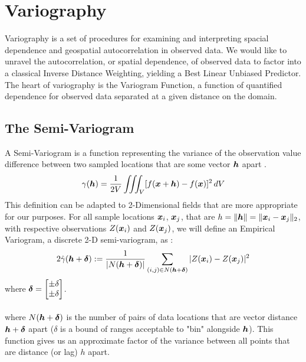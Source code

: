 \documentclass[11pt]{ucthesis}
\newcommand{\vect}[1]{{\it{\boldsymbol{#1}}}}
\begin{document}
\newpage

\section{Variography}
Variography is a set of procedures for examining and interpreting spacial dependence and geospatial autocorrelation in observed data. We would like to unravel the autocorrelation, or spatial dependence, of observed data to factor into a classical Inverse Distance Weighting, yielding a Best Linear Unbiased Predictor. The heart of variography is the Variogram Function, a function of quantified dependence for observed data separated at a given distance on the domain.

\subsection{The Semi-Variogram}
A Semi-Variogram is a function representing the variance of the observation value difference between two sampled locations that are some vector $\vect{h}$ apart \cite{matheron:geostat}.
\begin{equation}
	\gamma(\vect{h})=\frac{1}{2V}\iiint_V [f(\vect{x}+\vect{h})-f(\vect{x})]^2 \,dV \\
\end{equation}
This definition can be adapted to 2-Dimensional fields that are more appropriate for our purposes. For all sample locations $\vect{x}_{i}$, $\vect{x}_{j}$, that are $h=\|\vect{h}\|=\|\vect{x}_{i} - \vect{x}_{j} \|_{2}$, with respective observations $Z(\vect{x}_{i})$ and $Z(\vect{x}_{j})$, we will define an Empirical Variogram, a discrete 2-D semi-variogram, as \cite{cressie:spatial}:
\begin{equation} \label{eq:exp_var}
	2\hat{\gamma}(\vect{h}+\vect{\delta}) := \frac{1}{|N(\vect{h}+\vect{\delta})|}\sum\limits_{(i,j)\in N(\vect{h}+\vect{\delta})}|Z(\vect{x}_i) - Z(\vect{x}_j)|^2 %
\end{equation}
where $\vect{\delta}=\begin{bmatrix}\pm\delta\\ \pm\delta\end{bmatrix}$.\\\\
where $N(\vect{h}+\vect{\delta})$ is the number of pairs of data locations that are vector distance $\vect{h}+\vect{\delta}$ apart ($\delta$ is a bound of ranges acceptable to "bin" alongside $\vect{h}$).
This function gives us an approximate factor of the variance between all points that are distance (or lag) $h$ apart.\cite{cressie:spatial}
\end{document}

